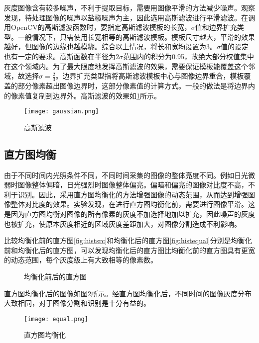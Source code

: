 灰度图像含有较多噪声，不利于提取目标，需要用图像平滑的方法减少噪声。观察发现，待处理图像的噪声以盐椒噪声为主，因此选用高斯滤波进行平滑滤波。在调用OpenCV的高斯滤波函数时，要指定高斯滤波模板的长宽，$\sigma$值和边界扩充类型。一般情况下，只需使用长宽相等的高斯滤波模板。模板尺寸越大，平滑的效果越好，但图像的边缘也越模糊。综合以上情况，将长和宽均设置为3。$\sigma$值的设定也有一定的要求。高斯函数在半径为$2\sigma$范围内的积分为0.95，故绝大部分权值集中在这个领域内。为了最大限度地发挥高斯滤波的效果，需要保证模板能覆盖这个邻域，故选择$\sigma=\frac{2}{3}$。边界扩充类型指将高斯滤波模板中心与图像边界重合，模板覆盖的部分像素超出图像边界时，这部分像素值的计算方式。一般的做法是将边界内的像素值复制到边界外。高斯滤波的效果如\ref{fig:gauss}所示。
\begin{figure}[h]
  \centering
  \texttt{[image: gaussian.png]}
  \caption{高斯滤波}
  \label{fig:gauss}
\end{figure}

\subsection{直方图均衡}


由于不同时间内光照条件不同，不同时间采集的图像的整体亮度不同。例如日光微弱时图像整体偏暗，日光强烈时图像整体偏亮。偏暗和偏亮的图像对比度不高，不利于识别。因此，采用直方图均衡化的方法增强图像的动态范围，从而达到增强图像整体对比度的效果。实验发现，在进行直方图均衡化前，需要进行图像平滑。这是因为直方图均衡对图像的所有像素的灰度不加选择地加以扩充，因此噪声的灰度也被扩充，使原本灰度相近的区域灰度差距加大，对图像分割造成不利影响。

比较均衡化前的直方图\ref{fig:histsrc}和均衡化后的直方图\ref{fig:histequal}分别是均衡化前和均衡化后的直方图，可以发现均衡化后的直方图比均衡化前的直方图具有更宽的动态范围，每个灰度级上有大致相等的像素数。
\begin{figure}[h]
  \centering
  \caption{均衡化前后的直方图}
\end{figure}
直方图均衡化后的图像如图\ref{fig:equal}所示。经直方图均衡化后，不同时间的图像灰度分布大致相同，对于图像分割和识别是十分有益的。
\begin{figure}[h]
  \centering
  \texttt{[image: equal.png]}
  \caption{直方图均衡化}
  \label{fig:equal}
\end{figure}



